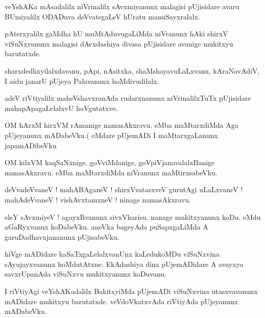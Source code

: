\documentclass{article}
\begin{document}
\begin{mn}%
veYshAKa mAsadalilx niVrinalilx sAvxmiyanunx malagisi pUjisidare avaru BUmiyalilx ODADuva 
deVvategaLeV hUratu manuSayxralalx.
\end{mn}

\begin{mn}%
pAterxyalilx gaMdha hU muMtAduvugaLiMda niVranunx hAki shirxV viSuNxvanunx malagisi dAvxdashiya 
divasa pUjisidare avanige mukitxyu barutatxde.
\end{mn}

\begin{mn}%
sharxdedhxyilalxdavanu, pApi, nAsitxka, shaMshayavuLaLxvanu, kAraNavAdiV, I aidu janarU pUjeya 
Palavanunx hoMdivudilalx.
\end{mn}

\begin{mn}%
adeV riVtiyalilx maheVshavxranAda rudarxnanunx niVrinalilxTuTx pUjisidare mahapApagaLelalxvU 
hoVgutatxve.
\end{mn}

\begin{mn}%
OM hArxM hirxVM rAmanige namasAkxravu. eMba maMtarxdiMda Aga pUjeyanunx mADabeVku.( eMdare pUjemADi 
I maMtarxgaLanunx japamADibeVku
\end{mn}

\begin{mn}%
OM kilxVM kaqSaNxnige, goVviMdanige, goVpiVjanavalalxBanige namasAkxravu. eMba maMtarxdiMda 
niVranunx maMtirxsabeVku.
\end{mn}

\begin{mn}%
deVvadeVvaneV ! mahABAganeV ! shirxVvatasxveV gurutAgi uLaLxvaneV ! mahAdeVvaneV ! vishAvxtamxneV ! 
ninage namasAkxravu.
\end{mn}

\begin{mn}%
eleY sAvxmiyeV ! agayxRvanunx sivxVkarisu. nanage mukitxyanunx koDu. eMdu aGaRyxvanux koDabeVku. 
aneVka bageyAda puSapxgaLiMda A garuDadhavxjananunx pUjisabeVku.
\end{mn}

\begin{mn}%
hiVge mADidare kaSaTxgaLelalxvanUnx kaLedukoMDu viSuNxvina sAyujayxvanunx hoMdutAtxne. EkAdashiya 
dina pUjemADidare A avayxya savxrUpanAda viSuNxvu mukitxyanunx koDuvanu.
\end{mn}

\begin{mn}%
I riVtiyAgi veYshAKadalilx BakitxyiMda pUjemADi viSuNxvina utasxvavanunx mADidare mukitxyu 
barutatxde. veVdoVkatxvAda riVtiyAda pUjeyanunx mADabeVku.
\end{mn}
\end{document}
